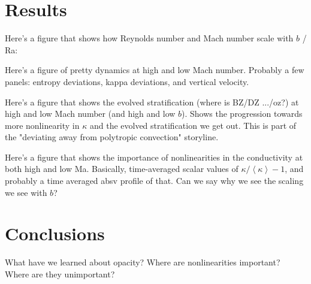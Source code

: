 \documentclass[twocolumn, amsmath, amsfonts, amssymb]{aastex62}
\newcommand{\angles}[1]{\ensuremath{\left\langle #1 \right\rangle}}
\begin{document}
\section{Results} \label{sec:results}
Here's a figure that shows how Reynolds number and Mach number
scale with $b$ / Ra:

Here's a figure of pretty dynamics at high and low Mach number. Probably
a few panels: entropy deviations, kappa deviations, and vertical velocity.

Here's a figure that shows the evolved stratification (where is BZ/DZ .../oz?) 
at high and low Mach number (and high and low $b$). Shows the progression towards
more nonlinearity in $\kappa$ and the evolved stratification we get out. This
is part of the "deviating away from polytropic convection" storyline.

Here's a figure that shows the importance of nonlinearities in
the conductivity at both high and low Ma. Basically, time-averaged scalar
values of $\kappa/\angles{\kappa} - 1$, and probably a time averaged
absv profile of that. Can we say why we see the scaling we see with $b$?


\section{Conclusions} \label{sec:conclusions}
What have we learned about opacity? Where are nonlinearities important?
Where are they unimportant?



\end{document}
